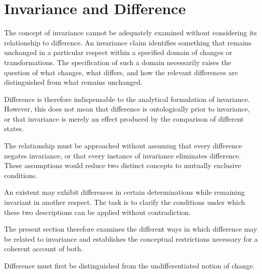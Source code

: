 

\section{Invariance and Difference}
\label{sec:invariance-and-difference}


The concept of invariance cannot be adequately examined
without considering its relationship to difference.
An invariance claim identifies something that remains
unchanged in a particular respect within a specified
domain of changes or transformations. The specification
of such a domain necessarily raises the question of
what changes, what differs, and how the relevant
differences are distinguished from what remains
unchanged.

Difference is therefore indispensable to the analytical
formulation of invariance. However, this does not mean
that difference is ontologically prior to invariance,
or that invariance is merely an effect produced by
the comparison of different states.

The relationship must be approached without assuming
that every difference negates invariance, or that
every instance of invariance eliminates difference.
These assumptions would reduce two distinct concepts
to mutually exclusive conditions.

An existent may exhibit differences in certain
determinations while remaining invariant in another
respect. The task is to clarify the conditions under
which these two descriptions can be applied without
contradiction.

The present section therefore examines the different
ways in which difference may be related to invariance
and establishes the conceptual restrictions necessary
for a coherent account of both.


Difference must first be distinguished from the
undifferentiated notion of change.

